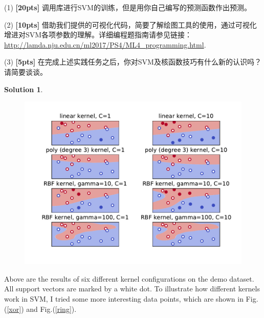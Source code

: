 \documentclass[a4paper,UTF8]{article}
\numberwithin{equation}{section}
\theoremstyle{definition}
\newtheorem*{solution}{Solution}
\begin{document}
(1) \textbf{[20pts]} 调用库进行SVM的训练，但是用你自己编写的预测函数作出预测。

(2) \textbf{[10pts]} 借助我们提供的可视化代码，简要了解绘图工具的使用，通过可视化增进对SVM各项参数的理解。详细编程题指南请参见链接：\url{http://lamda.nju.edu.cn/ml2017/PS4/ML4_programming.html}. 

(3) \textbf{[5pts]} 在完成上述实践任务之后，你对SVM及核函数技巧有什么新的认识吗？请简要谈谈。

\begin{solution}
\begin{figure}[htbp] %
   \centering
   \includegraphics[width=5in]{figure.pdf} 
\end{figure}
Above are the results of six different kernel configurations on the demo dataset. All support vectors are marked by a white dot. To illustrate how different kernels work in SVM, I tried some more interesting data points, which are shown in Fig.(\ref{xor}) and Fig.(\ref{ring}).


\end{solution}
\end{document}
